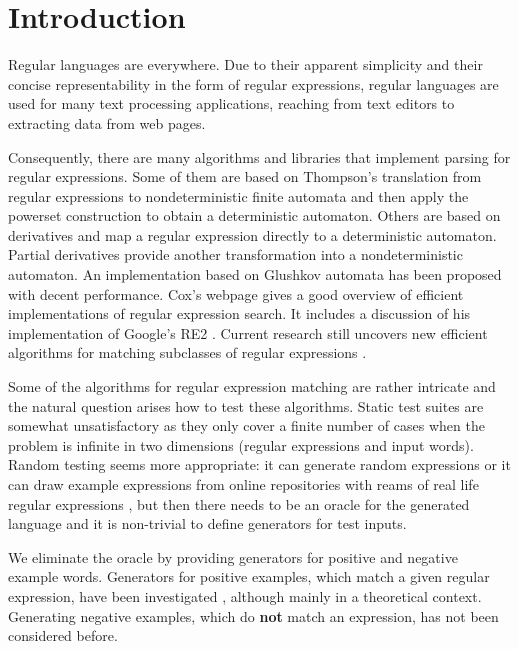 \section{Introduction}

Regular languages are everywhere. Due to their apparent simplicity and
their concise representability in the form of regular expressions,
regular languages are used for many text processing
applications, reaching from text editors
\cite{DBLP:journals/cacm/Thompson68} to extracting data from web
pages.

Consequently, there are many algorithms and libraries that implement
parsing for regular expressions. Some of them are based on Thompson's
translation from regular expressions to nondeterministic finite
automata and then apply the powerset construction to obtain a
deterministic automaton. Others are based on derivatives
\cite{Brzozowski1964} and
map a regular expression directly to a deterministic
automaton. Partial derivatives \cite{Antimirov96Partial}
provide another transformation into a nondeterministic automaton. An
implementation based on Glushkov automata has been proposed
\cite{DBLP:conf/icfp/FischerHW10} with decent performance.
Cox's webpage \cite{cox07:_implem_regul_expres} gives a good overview
of efficient implementations of regular expression search. It includes
a discussion of his implementation of Google's RE2 \cite{cox10:_regul_expres_match_wild}.
Current research still uncovers new efficient algorithms for matching
subclasses of regular expressions \cite{DBLP:journals/jcss/GrozM17}.

Some of the algorithms for regular expression matching are rather
intricate and the natural question arises how to test these
algorithms. Static test suites are somewhat unsatisfactory as they
only cover a finite number of cases when the problem is infinite in
two dimensions (regular expressions and input words). Random testing
seems more appropriate: it can generate random expressions or it can
draw example expressions from online repositories with reams of real
life regular expressions \cite{regul_expres_librar}, but then there
needs to be an oracle for the generated language and it is non-trivial
to define generators for test inputs.

We eliminate the oracle by providing generators for positive and
negative example words. Generators for positive examples, which match
a given regular expression, have been
investigated \cite{DBLP:journals/jcss/GrozM17,
  DBLP:journals/tcs/AckermanS09, DBLP:journals/jfp/McIlroy04,
  DBLP:journals/actaC/Makinen97}, although mainly in a theoretical
context. Generating negative examples, which do \textbf{not} match an
expression, has not been considered before.

